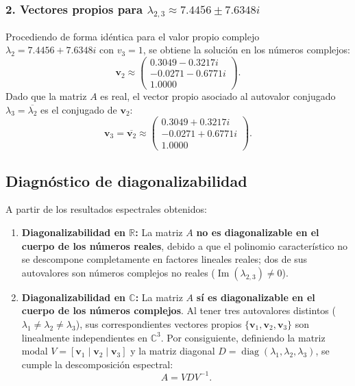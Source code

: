 \documentclass[spanish,letterpaper,oneside]{article}
\begin{document}
\subsubsection*{2. Vectores propios para $\lambda_{2,3} \approx 7.4456 \pm 7.6348i$}
Procediendo de forma idéntica para el valor propio complejo $\lambda_2 = 7.4456 + 7.6348i$ con $v_3 = 1$, se obtiene la solución en los números complejos:
\begin{equation}
\mathbf{v}_2 \approx \begin{pmatrix}
0.3049 - 0.3217i \\
-0.0271 - 0.6771i \\
1.0000
\end{pmatrix}.
\end{equation}
Dado que la matriz $A$ es real, el vector propio asociado al autovalor conjugado $\lambda_3 = \overline{\lambda_2}$ es el conjugado de $\mathbf{v}_2$:
\begin{equation}
\mathbf{v}_3 = \overline{\mathbf{v}_2} \approx \begin{pmatrix}
0.3049 + 0.3217i \\
-0.0271 + 0.6771i \\
1.0000
\end{pmatrix}.
\end{equation}

\subsection{Diagnóstico de diagonalizabilidad}

A partir de los resultados espectrales obtenidos:
\begin{enumerate}
\item \textbf{Diagonalizabilidad en $\mathbb{R}$:} La matriz $A$ \textbf{no es diagonalizable en el cuerpo de los números reales}, debido a que el polinomio característico no se descompone completamente en factores lineales reales; dos de sus autovalores son números complejos no reales ($\operatorname{Im}(\lambda_{2,3}) \neq 0$).
\item \textbf{Diagonalizabilidad en $\mathbb{C}$:} La matriz $A$ \textbf{sí es diagonalizable en el cuerpo de los números complejos}. Al tener tres autovalores distintos ($\lambda_1 \neq \lambda_2 \neq \lambda_3$), sus correspondientes vectores propios $\{\mathbf{v}_1, \mathbf{v}_2, \mathbf{v}_3\}$ son linealmente independientes en $\mathbb{C}^3$. Por consiguiente, definiendo la matriz modal $V = [\mathbf{v}_1 \mid \mathbf{v}_2 \mid \mathbf{v}_3]$ y la matriz diagonal $D = \operatorname{diag}(\lambda_1, \lambda_2, \lambda_3)$, se cumple la descomposición espectral:
\begin{equation}
A = V D V^{-1}.
\end{equation}
\end{enumerate}
\end{document}
